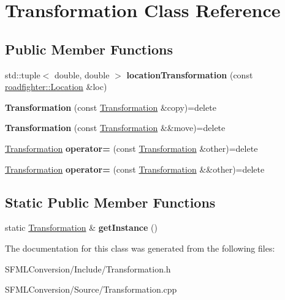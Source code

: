 \hypertarget{classTransformation}{}\section{Transformation Class Reference}
\label{classTransformation}
\subsection*{Public Member Functions}
\begin{DoxyCompactItemize}
\item 
\mbox{\label{classTransformation_a65a5cdfc705e00a299a463e6f7b916ef}} 
std\+::tuple$<$ double, double $>$ {\bfseries location\+Transformation} (const \hyperlink{classroadfighter_1_1Location}{roadfighter\+::\+Location} \&loc)
\item 
\mbox{\label{classTransformation_a57c76d966ef85e477ff96308a1a78ac7}} 
{\bfseries Transformation} (const \hyperlink{classTransformation}{Transformation} \&copy)=delete
\item 
\mbox{\label{classTransformation_a2cda67dca866d42f0f9fbb743b117f4c}} 
{\bfseries Transformation} (const \hyperlink{classTransformation}{Transformation} \&\&move)=delete
\item 
\mbox{\label{classTransformation_a23d584b571e04044be0645b91985ff39}} 
\hyperlink{classTransformation}{Transformation} {\bfseries operator=} (const \hyperlink{classTransformation}{Transformation} \&other)=delete
\item 
\mbox{\label{classTransformation_a1ed9a68ef131bc75ead5e80283101fe4}} 
\hyperlink{classTransformation}{Transformation} {\bfseries operator=} (const \hyperlink{classTransformation}{Transformation} \&\&other)=delete
\end{DoxyCompactItemize}
\subsection*{Static Public Member Functions}
\begin{DoxyCompactItemize}
\item 
\mbox{\label{classTransformation_a33d49600e087b60273b3ec316e00d9cb}} 
static \hyperlink{classTransformation}{Transformation} \& {\bfseries get\+Instance} ()
\end{DoxyCompactItemize}


The documentation for this class was generated from the following files\+:\begin{DoxyCompactItemize}
\item 
S\+F\+M\+L\+Conversion/\+Include/Transformation.\+h\item 
S\+F\+M\+L\+Conversion/\+Source/Transformation.\+cpp\end{DoxyCompactItemize}
